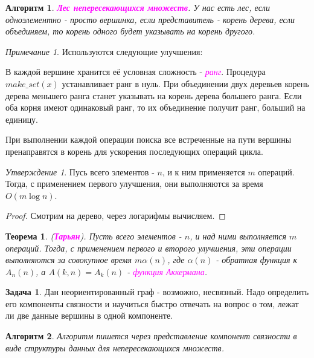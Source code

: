 \documentclass[a4paper]{article}
\theoremstyle{indented}
\newtheorem{theorem}{Теорема}
\newtheorem{alg}{Алгоритм}
\theoremstyle{definition}
\newtheorem{prob}{Задача}
\theoremstyle{remark}
\newtheorem{remark}{Примечание}
\newtheorem{stat}{Утверждение}
\begin{document}
\begin{alg}
    \textcolor{magenta}{\hypertarget{t20}{\textbf{Лес непересекающихся множеств}}}. У нас есть лес, если одноэлементно - просто вершинка, если представитель - корень дерева, если объединяем, то корень одного будет указывать на корень другого.
\end{alg}

\begin{remark}
    Используются следующие улучшения: \ 
    
    В каждой вершине хранится её условная сложность - \textcolor{magenta}{\hypertarget{d8}{\textit{ранг}}}. Процедура $make\_set(x)$ устанавливает ранг в нуль. При объединении двух деревьев корень дерева меньшего ранга станет указывать на корень дерева большего ранга. Если оба корня имеют одинаковый ранг, то их объединение получит ранг, больший на единицу. \ 

    При выполнении каждой операции поиска все встреченные на пути вершины пренаправятся в корень для ускорения последующих операций цикла.
\end{remark}

\begin{stat}
    Пусь всего элементов - $n$, и к ним применяется $m$ операций. Тогда, с применением первого улучшения, они выполняются за время $O(m \log n)$. 
\end{stat}

\begin{proof}
    Смотрим на дерево, через логарифмы вычисляем.
\end{proof}

\begin{theorem}
    (\textcolor{magenta}{\hypertarget{t21}{\textbf{Тарьян}}}). Пусть всего элементов - $n$, и над ними выполняется $m$ операций. Тогда, с применением первого и второго улучшения, эти операции выполняются за совокупное время $m\alpha (n)$, где $\alpha(n)$ - обратная функция к $A_n(n)$, а $A(k, n)=A_k(n)$ - \textcolor{magenta}{\hypertarget{d9}{\textit{функция Аккермана}}}. 
\end{theorem}

\begin{prob}
    Дан неориентированный граф - возможно, несвязный. Надо определить его компоненты связности и научиться быстро отвечать на вопрос о том, лежат ли две данные вершины в одной компоненте.
\end{prob}

\begin{alg}
    Алгоритм пишется через представление компонент связности в виде структуры данных для непересекающихся множеств.
\end{alg} \
\end{document}

